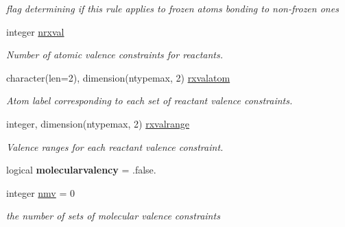 \begin{DoxyCompactItemize}
\begin{DoxyCompactList}\small\item\em flag determining if this rule applies to frozen atoms bonding to non-\/frozen ones \end{DoxyCompactList}\item 
\mbox{\label{namespaceglobaldata_a8fd37bb8c793c76b3dedfce33555b295}} 
integer \mbox{\hyperlink{namespaceglobaldata_a8fd37bb8c793c76b3dedfce33555b295}{nrxval}}
\begin{DoxyCompactList}\small\item\em Number of atomic valence constraints for reactants. \end{DoxyCompactList}\item 
\mbox{\label{namespaceglobaldata_a31516a9611bae43b97db4de74361251c}} 
character(len=2), dimension(ntypemax, 2) \mbox{\hyperlink{namespaceglobaldata_a31516a9611bae43b97db4de74361251c}{rxvalatom}}
\begin{DoxyCompactList}\small\item\em Atom label corresponding to each set of reactant valence constraints. \end{DoxyCompactList}\item 
\mbox{\label{namespaceglobaldata_a993988ace1c9918cfea218763dc41f2b}} 
integer, dimension(ntypemax, 2) \mbox{\hyperlink{namespaceglobaldata_a993988ace1c9918cfea218763dc41f2b}{rxvalrange}}
\begin{DoxyCompactList}\small\item\em Valence ranges for each reactant valence constraint. \end{DoxyCompactList}\item 
\mbox{\label{namespaceglobaldata_a373df34cdc10d6fcb1ed11a684740e5b}} 
logical {\bfseries molecularvalency} = .false.
\item 
\mbox{\label{namespaceglobaldata_a8d9d62d66b760d4cde9901e33f03be8f}} 
integer \mbox{\hyperlink{namespaceglobaldata_a8d9d62d66b760d4cde9901e33f03be8f}{nmv}} = 0
\begin{DoxyCompactList}\small\item\em the number of sets of molecular valence constraints \end{DoxyCompactList}\item 

\end{DoxyCompactItemize}

